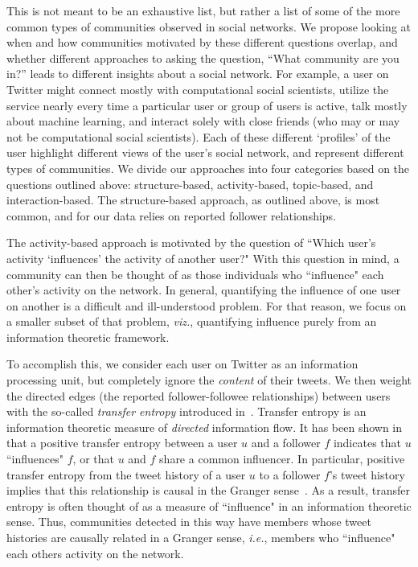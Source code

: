 This is not meant to be an exhaustive list, but rather a list of some of the more common types of communities observed in social networks. We propose looking at when and how communities motivated by these different questions overlap, and whether different approaches to asking the question, ``What community are you in?'' leads to different insights about a social network. For example, a user on Twitter might connect mostly with computational social scientists, utilize the service nearly every time a particular user or group of users is active, talk mostly about machine learning, and interact solely with close friends (who may or may not be computational social scientists). Each of these different `profiles' of the user highlight different views of the user's social network, and represent different types of communities. We divide our approaches into four categories based on the questions outlined above: structure-based, activity-based, topic-based, and interaction-based. The structure-based approach, as outlined above, is most common, and for our data relies on reported follower relationships.

The activity-based approach is motivated by the question of ``Which user's activity `influences' the activity of another user?" %
 With this question in mind, a community can then be thought of as those individuals who ``influence" each other's activity on the network. In general, quantifying the influence of one user on another is a difficult and ill-understood problem. For that reason, we focus on a smaller subset of that problem, \emph{viz.}, quantifying influence purely from an information theoretic framework.

To accomplish this, we consider each user on Twitter as an information processing unit, but completely ignore the \emph{content} of their tweets. We then weight the directed edges (the reported follower-followee relationships) between users with the so-called \emph{transfer entropy} introduced in~\cite{schreiber2000measuring}.  Transfer entropy is an information theoretic measure of \emph{directed} information flow. It has been shown in~\cite{ver2012information} that a positive transfer entropy between a user $u$ and a follower $f$ indicates that $u$ ``influences" $f$, or that $u$ and $f$ share a common influencer. In particular, positive transfer entropy from the tweet history of a user $u$ to a follower $f$'s tweet history implies that this relationship is causal in the Granger sense~\cite{granger1963economic}. As a result, transfer entropy is often thought of as a measure of ``influence" in an information theoretic sense.  Thus, communities detected in this way have members whose tweet histories are causally related in a Granger sense, \emph{i.e.}, members who ``influence" each others activity on the network.

